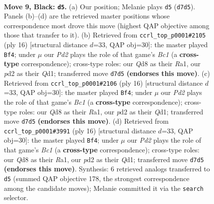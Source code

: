 \documentclass[11pt]{article}
\begin{document}
\clearpage

\begin{figure}[p]\centering
\begin{subfigure}{0.46\textwidth}\centering
\resizebox{\linewidth}{!}{%
\newchessgame
\chessboard[
  setfen={1rbq1rk1/pp1p1pbp/2n2np1/2p1p3/2P4P/4PNP1/PP1P1PB1/RNBQ1RK1 b - - 0 9},
  showmover=false,
  pgfstyle=straightmove, color=movearrow, markmove={d7-d5}
]}
\caption{}
\end{subfigure}\hfill
\begin{subfigure}{0.46\textwidth}\centering
\resizebox{\linewidth}{!}{%
\newchessgame
\chessboard[
  setfen={rnbq1rk1/pp3pbp/4pnp1/3p4/3P4/2N2NP1/PP2PPBP/R1BQ1RK1 w - - 0 9},
  showmover=false,
  pgfstyle=straightmove, color=movearrow, markmove={c1-f4}
]}
\caption{}
\end{subfigure}
\\[4pt]
\begin{subfigure}{0.46\textwidth}\centering
\resizebox{\linewidth}{!}{%
\newchessgame
\chessboard[
  setfen={rnbq1rk1/pp3pbp/4pnp1/3p4/3P4/2N2NP1/PP2PPBP/R1BQ1RK1 w - - 0 9},
  showmover=false,
  pgfstyle=straightmove, color=movearrow, markmove={c1-f4}
]}
\caption{}
\end{subfigure}\hfill
\begin{subfigure}{0.46\textwidth}\centering
\resizebox{\linewidth}{!}{%
\newchessgame
\chessboard[
  setfen={rnbq1rk1/pp3pbp/4pnp1/3p4/3P4/2N2NP1/PP2PPBP/R1BQ1RK1 w - - 0 9},
  showmover=false,
  pgfstyle=straightmove, color=movearrow, markmove={c1-f4}
]}
\caption{}
\end{subfigure}
\caption{\textbf{Move 9, Black: \texttt{d5}.} (a) Our position; Melanie plays \texttt{d5} (\texttt{d7d5}). Panels (b)--(d) are the retrieved master positions whose correspondence most drove this move (highest QAP objective among those that transfer to it). (b) Retrieved from \texttt{ccrl\_top\_p0001\#2105} (ply 16) [structural distance $d$=33, QAP obj=30]: the master played \texttt{Bf4}; under $\mu$ our \emph{Pd2} plays the role of that game's \emph{Bc1} (a \textbf{cross-type} correspondence); cross-type roles: our \emph{Q}d8 as their \emph{R}a1, our \emph{p}d2 as their \emph{Q}d1; transferred move \texttt{d7d5} \textbf{(endorses this move)}. (c) Retrieved from \texttt{ccrl\_top\_p0001\#2106} (ply 16) [structural distance $d$=33, QAP obj=30]: the master played \texttt{Bf4}; under $\mu$ our \emph{Pd2} plays the role of that game's \emph{Bc1} (a \textbf{cross-type} correspondence); cross-type roles: our \emph{Q}d8 as their \emph{R}a1, our \emph{p}d2 as their \emph{Q}d1; transferred move \texttt{d7d5} \textbf{(endorses this move)}. (d) Retrieved from \texttt{ccrl\_top\_p0001\#3991} (ply 16) [structural distance $d$=33, QAP obj=30]: the master played \texttt{Bf4}; under $\mu$ our \emph{Pd2} plays the role of that game's \emph{Bc1} (a \textbf{cross-type} correspondence); cross-type roles: our \emph{Q}d8 as their \emph{R}a1, our \emph{p}d2 as their \emph{Q}d1; transferred move \texttt{d7d5} \textbf{(endorses this move)}. Synthesis: 6 retrieved analogs transferred to \texttt{d5} (summed QAP objective 178, the strongest correspondence among the candidate moves); Melanie committed it via the \texttt{search} selector.}
\label{fig:thought-m17}
\end{figure}
\end{document}
